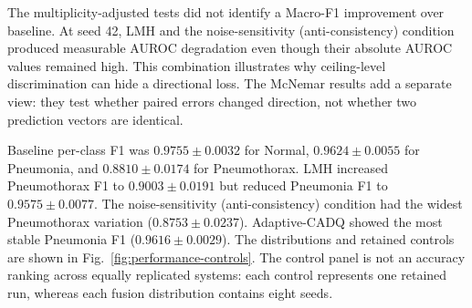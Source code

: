 \documentclass[10pt,a4paper,twocolumn]{article}
\begin{document}
\begin{table}[t]
\centering
\caption{Performance and calibration across eight seeds.}
\label{tab:performance}
\scriptsize
\setlength{\tabcolsep}{3.2pt}
\end{table}

The multiplicity-adjusted tests did not identify a Macro-F1 improvement over
baseline. At seed 42, LMH and the noise-sensitivity (anti-consistency) condition
produced measurable AUROC degradation even though their absolute AUROC values
remained high. This combination illustrates why ceiling-level discrimination
can hide a directional loss. The McNemar results add a separate view: they test
whether paired errors changed direction, not whether two prediction vectors are
identical.

Baseline per-class F1 was $0.9755\pm0.0032$ for Normal,
$0.9624\pm0.0055$ for Pneumonia, and $0.8810\pm0.0174$ for
Pneumothorax. LMH increased Pneumothorax F1 to $0.9003\pm0.0191$ but
reduced Pneumonia F1 to $0.9575\pm0.0077$. The noise-sensitivity
(anti-consistency) condition had the
widest Pneumothorax variation ($0.8753\pm0.0237$). Adaptive-CADQ showed
the most stable Pneumonia F1 ($0.9616\pm0.0029$). The distributions and
retained controls are shown in Fig.~\ref{fig:performance-controls}. The control
panel is not an accuracy ranking across equally replicated systems: each
control represents one retained run, whereas each fusion distribution contains
eight seeds.
\end{document}
